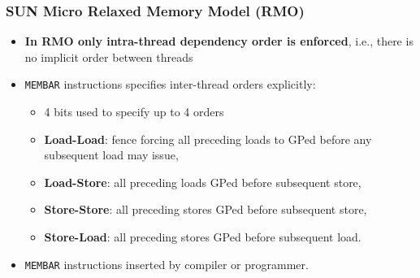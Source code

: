 \documentclass{beamer}
\newcommand{\emp}[1]{\textcolor{DikuRed}{ #1}}
\begin{document}
\begin{frame}[fragile,t]
\frametitle{SUN Micro Relaxed Memory Model (RMO)}

\begin{itemize}
    \item \emp{\bf In RMO only intra-thread dependency order is enforced},
            i.e., there is no implicit order between threads\medskip

    \item \emp{\tt MEMBAR} instructions specifies inter-thread orders explicitly:
    \begin{itemize}
        \item 4 bits used to specify up to 4 orders
        \item \emp{\bf Load-Load}: fence forcing all preceding loads to GPed before any subsequent load may issue,
        \item \emp{\bf Load-Store}: all preceding loads GPed before subsequent store,
        \item \emp{\bf Store-Store}: all preceding stores GPed before subsequent store,
        \item \emp{\bf Store-Load}: all preceding stores GPed before subsequent load.
    \end{itemize}
    \item {\tt MEMBAR} instructions inserted by compiler or programmer.
\end{itemize}
\end{frame}
\end{document}
